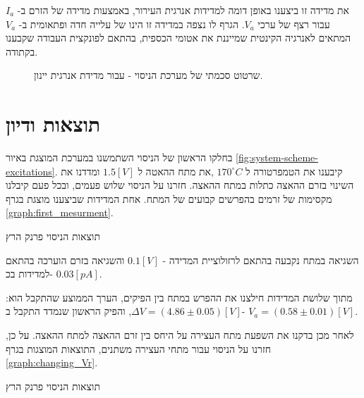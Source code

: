 \documentclass{article}
\begin{document}
את מדידה זו ביצענו באופן דומה למדידות אנרגית העירור, באמצעות מדידה של הזרם ב-
$I_a$
עבור רצף של ערכי
$V_a$.
הגרף לו נצפה במדידה זו הינו של עלייה חדה ופתאומית ב-
$V_a$
המתאים לאנרגיה הקינטית שמייננת את אטומי הכספית, בהתאם לפונקצית העבודה שקבענו בקתודה.

\begin{figure}
    \centering
    \caption{
    שרטוט סכמתי של מערכת הניסוי - עבור מדידת אנרגית יינון.
    }
    \label{fig:system-scheme-ionization}
\end{figure}

\clearpage

\section{תוצאות ודיון}
בחלקו הראשון של הניסוי השתמשנו במערכת המוצגת באיור
\ref{fig:system-scheme-excitations}.
קיבענו את הטמפרטורה ל
$170 ^{\circ} C$
,את מתח ההאטה ל
$1.5 [V]$
ומדדנו את השינוי בזרם ההאצה כתלות במתח ההאצה.
חזרנו על הניסוי שלוש פעמים, ובכל פעם קיבלנו מקסימות של זרמים בהפרשים קבועים של המתח.
אחת המדידות שביצענו מוצגת בגרף
\ref{graph:first_mesurment}.
 
\begin{graph}[H]
	\begin{center}
	\resizebox{\textwidth}{!}{}
	\end{center}
	\caption{תוצאות הניסוי פרנק הרץ}
\label{graph:first_mesurment}
\end{graph}

השגיאה במתח נקבעה בהתאם לרזולוציית המדידה - 
$0.1 [V]$
והשגיאה בזרם הוערכה בהתאם למדידות בכ- 
$0.03 [pA]$.



מתוך שלושת המדידות חילצנו את ההפרש במתח בין הפיקים, הערך הממוצע שהתקבל הוא:
$\Delta V = (4.86 \pm 0.05)[V]$,
והפיק הראשון שנמדד התקבל ב- 
$V_a = (0.58 \pm 0.01)[V]$.


לאחר מכן בדקנו את השפעת מתח העצירה על היחס בין זרם ההאצה למתח ההאצה.
על כן, חזרנו על הניסוי עבור מתחי העצירה משתנים, התוצאות המוצגות בגרף
\ref{graph:changing_Vr}.

\begin{graph}[H]
	\begin{center}
	\resizebox{\textwidth}{!}{}
	\end{center}
	\caption{תוצאות הניסוי פרנק הרץ}
	\label{graph:changing_Vr}
\end{graph}
\end{document}
